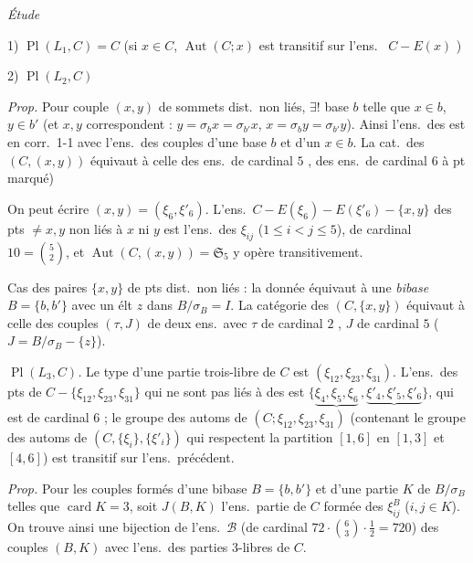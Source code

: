 \documentclass[11pt,a4paper]{article}
\begin{document}
\emph{Étude } 

1) $\operatorname{Pl}(L_1,C)=C$ (si $x\in C$, $\operatorname{Aut}(C;x)$ est transitif sur l'ens.\  \struck{\ill{}} $C-E(x)$ \struck{[\ill{}]})

2) $\operatorname{Pl}(L_2,C)$

\emph{Prop.} Pour  couple $(x,y)$ de sommets dist.\ non liés, $\exists!$ base $b$ telle que $x\in b$, $y\in b'$  (et $x,y$  correspondent : $y=\sigma_b x=\sigma_{b'}x$, $x=\sigma_b y=\sigma_{b'}y$). Ainsi l'ens.\ des  \struck{\ill{}} est en corr.\ 1-1 avec l'ens.\ des couples d'une base $b$ et d'un $x\in b$. La cat.\ des $(C,(x,y))$ équivaut à celle des ens.\ de cardinal $5$ \ill{}, des ens.\ de cardinal $6$ à pt marqué)

On peut écrire $(x,y)=(\xi_6,\xi'_6)$. L'ens.\ $C-E(\xi_6)-E(\xi'_6)-\lbrace x,y\rbrace$ des pts $\neq x,y$ non liés à $x$ ni $y$ est l'ens.\ des $\xi_{ij}$ ($1\leq i<j\leq5$), de cardinal $10=\binom{5}{2}$, et $\operatorname{Aut}(C,(x,y))=\mathfrak{S}_5$ y opère transitivement.

Cas des paires $\lbrace x,y\rbrace$ de pts dist.\ non liés : la donnée équivaut à une \emph{bibase} $B=\lbrace b,b'\rbrace$ avec un élt $z$ dans $B/\sigma_B=I$. La catégorie des $(C,\lbrace x,y\rbrace)$ équivaut à celle des couples $(\tau,J)$ de deux ens.\ avec $\tau$ de cardinal $2$ , $J$ de cardinal $5$ ($J=B/\sigma_B-\lbrace z\rbrace$).

\emph{$\operatorname{Pl}(L_3,C)$.} Le type d'une partie  trois-libre  de $C$ est $(\xi_{12},\xi_{23},\xi_{31})$. L'ens.\ des pts de $C-\lbrace\xi_{12},\xi_{23},\xi_{31}\rbrace$ qui ne sont pas liés à   des  est $\lbrace\underbrace{\xi_4,\xi_5,\xi_6}\,,\underbrace{\xi'_4,\xi'_5,\xi'_6}\rbrace$\marginal{\ill{}}, qui est de cardinal $6$ ; le groupe des automs de $(C;\xi_{12},\xi_{23},\xi_{31})$ (contenant le groupe des automs de $(C,\lbrace\xi_i\rbrace,\lbrace\xi'_i\rbrace)$ qui respectent la partition  $[1,6]$ en $[1,3]$ et $[4,6]$) est transitif sur l'ens.\ précédent.

\emph{Prop.} Pour les couples  formés d'une bibase $B=\lbrace b,b'\rbrace$  et d'une partie $K$ de $B/\sigma_B$ telles que $\operatorname{card}K=3$, soit $J(B,K)$ l'ens.\ partie de $C$ formée des $\xi^B_{ij}$ ($i,j\in K$). On trouve ainsi une bijection de l'ens.\ $\mathcal{B}$ (de cardinal $72\cdot\binom{6}{3}\cdot\frac12=720$) des couples $(B,K)$ avec l'ens.\ des parties $3$-libres de $C$.
\end{document}
